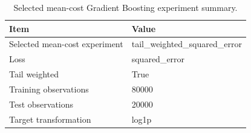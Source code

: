 \begin{table}
\caption{Selected mean-cost Gradient Boosting experiment summary.}
\label{tab:06-selected-mean-summary}
\begin{tabular}{ll}
\toprule
Item & Value \\
\midrule
Selected mean-cost experiment & tail_weighted_squared_error \\
Loss & squared_error \\
Tail weighted & True \\
Training observations & 80000 \\
Test observations & 20000 \\
Target transformation & log1p \\
\bottomrule
\end{tabular}
\end{table}
